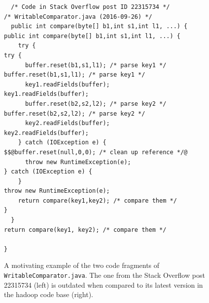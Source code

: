 \documentclass[sigconf,review, anonymous]{acmart}
\begin{document}
\begin{figure}
	\begin{lstlisting}
  /* Code in Stack Overflow post ID 22315734 */              /* WritableComparator.java (2016-09-26) */
  public int compare(byte[] b1,int s1,int l1, ...) {         public int compare(byte[] b1,int s1,int l1, ...) {
    try {                                                      try {
      buffer.reset(b1,s1,l1); /* parse key1 */                   buffer.reset(b1,s1,l1); /* parse key1 */
      key1.readFields(buffer);                                   key1.readFields(buffer);
      buffer.reset(b2,s2,l2); /* parse key2 */                   buffer.reset(b2,s2,l2); /* parse key2 */
      key2.readFields(buffer);                                   key2.readFields(buffer);
    } catch (IOException e) {                                    $$@buffer.reset(null,0,0); /* clean up reference */@
      throw new RuntimeException(e);                           } catch (IOException e) {
    }                                                            throw new RuntimeException(e);
    return compare(key1,key2); /* compare them */              }
  }                                                            return compare(key1, key2); /* compare them */
                                                            }
	\end{lstlisting}\vspace{-2ex}
	\caption{A motivating example of the two code fragments of
          {\small\texttt{WritableComparator.java}}. The one from the
          Stack Overflow post 22315734 (left) is outdated when compared to
          its latest version in the \textsf{hadoop} code base
          (right).}
	\label{fig:before-after}
\end{figure}
\end{document}

